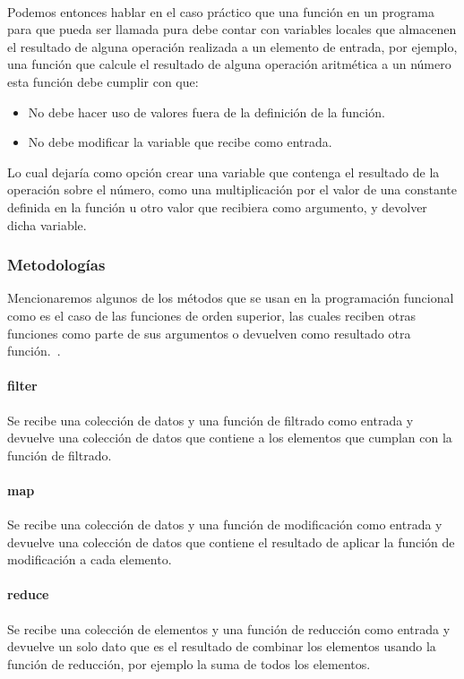 \documentclass[12pt]{article}
\begin{document}
	\paragraph{}
	Podemos entonces hablar en el caso práctico que una función en un programa para que pueda ser llamada pura debe contar con variables locales que almacenen el resultado de alguna operación realizada a un elemento de entrada, por ejemplo, una función que calcule el resultado de alguna operación aritmética a un número esta función debe cumplir con que:
	\begin{itemize}
		\item No debe hacer uso de valores fuera de la definición de la función.
		\item No debe modificar la variable que recibe como entrada.
	\end{itemize}
	Lo cual dejaría como opción crear una variable que contenga el resultado de la operación sobre el número, como una multiplicación por el valor de una constante definida en la función u otro valor que recibiera como argumento, y devolver dicha variable.
	\subsubsection{Metodologías}
	Mencionaremos algunos de los métodos que se usan en la programación funcional como es el caso de las funciones de orden superior, las cuales reciben otras funciones como parte de sus argumentos o devuelven como resultado otra función.~\cite{leandro_fp}.
	\paragraph{filter} 
	Se recibe una colección de datos y una función de filtrado como entrada  y devuelve una colección de datos que contiene a los elementos que cumplan con la función de filtrado.
	\paragraph{map} 
	Se recibe una colección de datos y una función de modificación como entrada  y devuelve una colección de datos que contiene el resultado de aplicar la función de modificación a cada elemento.
	\paragraph{reduce} 
	Se recibe una colección de elementos y una función de reducción como entrada  y devuelve un solo dato que es el resultado de combinar los elementos usando la función de reducción, por ejemplo la suma de todos los elementos.
\end{document}

